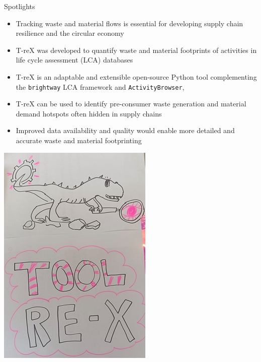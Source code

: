 \documentclass[review,3p,authoryear]{elsarticle}
\renewcommand{\texttt}[1]{{\ttfamily\small\nolinkurl{#1}}}
\begin{document}
\linenumbers{}


{\Large Spotlights}
\vspace{1em}
\begin{itemize}
    \item Tracking waste and material flows is essential for developing supply chain resilience and the circular economy
    \item T-reX was developed to quantify waste and material footprints of activities in life cycle assessment (LCA) databases
    \item T-reX is an adaptable and extensible open-source Python tool complementing the \texttt{brightway} LCA framework and \texttt{ActivityBrowser},
    \item T-reX can be used to identify pre-consumer waste generation and material demand hotspots often hidden in supply chains
    \item Improved data availability and quality would enable more detailed and accurate waste and material footprinting
\end{itemize}

\newpage
\begin{graphicalabstract}
    \includegraphics{grabs.jpg}
\end{graphicalabstract}
\end{document}
